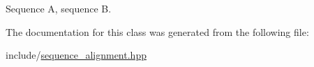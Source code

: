 Sequence A, sequence B. 



The documentation for this class was generated from the following file\+:\begin{DoxyCompactItemize}
\item 
include/\hyperlink{sequence__alignment_8hpp}{sequence\+\_\+alignment.\+hpp}\end{DoxyCompactItemize}
